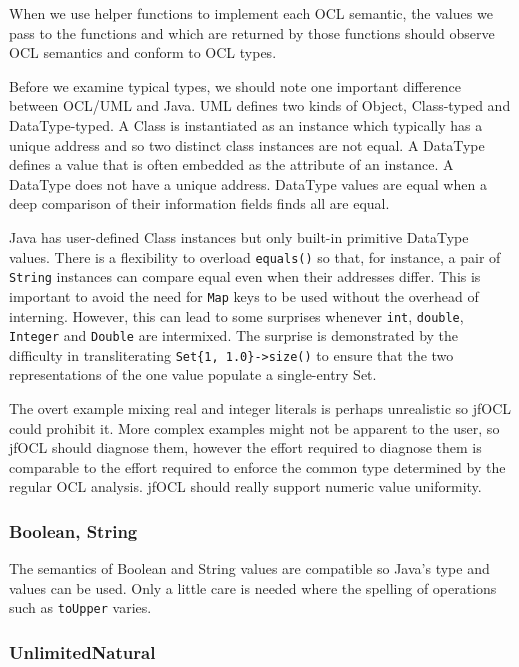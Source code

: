 \documentclass[sigconf]{acmart}
\begin{document}
When we use helper functions to implement each OCL semantic, the values we pass to the functions and which are returned by those functions should observe OCL semantics and conform to OCL types.

Before we examine typical types, we should note one important difference between OCL/UML and Java. UML defines two kinds of Object, Class-typed and DataType-typed. A Class is instantiated as an instance which typically has a unique address and so two distinct class instances are not equal. A DataType defines a value that is often embedded as the attribute of an instance. A DataType does not have a unique address. DataType values are equal when a deep comparison of their information fields finds all are equal.

Java has user-defined Class instances but only built-in primitive DataType values. There is a flexibility to overload \verb|equals()| so that, for instance, a pair of \verb|String| instances can compare equal even when their addresses differ. This is important to avoid the need for \verb|Map| keys to be used without the overhead of interning. However, this can lead to some surprises whenever \verb|int|, \verb|double|, \verb|Integer| and \verb|Double| are intermixed.
The surprise is demonstrated by the difficulty in transliterating \verb|Set{1, 1.0}->size()| to ensure that the two representations of the one value populate a single-entry Set.

The overt example mixing real and integer literals is perhaps unrealistic so jfOCL could prohibit it. More complex examples might not be apparent to the user, so jfOCL should diagnose them, however the effort required to diagnose them is comparable to the effort required to enforce the common type determined by the regular OCL analysis. jfOCL should really support numeric value uniformity.

\subsubsection{Boolean, String}

The semantics of Boolean and String values are compatible so Java's type and values can be used. Only a little care is needed where the spelling of operations such as \verb|toUpper| varies.

\subsubsection{UnlimitedNatural}
\end{document}
